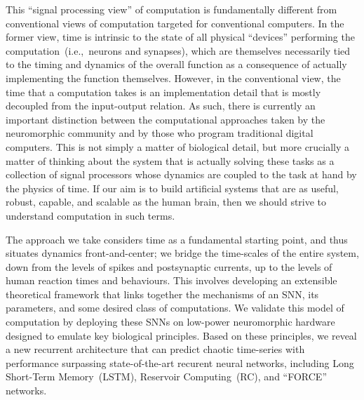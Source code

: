This ``signal processing view'' of computation is fundamentally different from conventional views of computation targeted for conventional computers.
In the former view, time is intrinsic to the state of all physical ``devices'' performing the computation~(i.e.,~neurons and synapses), which are themselves necessarily tied to the timing and dynamics of the overall function as a consequence of actually implementing the function themselves.
However, in the conventional view, the time that a computation takes is an implementation detail that is mostly decoupled from the input-output relation.
As such, there is currently an important distinction between the computational approaches taken by the neuromorphic community and by those who program traditional digital computers.
This is not simply a matter of biological detail, but more crucially a matter of thinking about the system that is actually solving these tasks as a collection of signal processors whose dynamics are coupled to the task at hand by the physics of time.
If our aim is to build artificial systems that are as useful, robust, capable, and scalable as the human brain, then we should strive to understand computation in such terms.

The approach we take considers time as a fundamental starting point, and thus situates dynamics front-and-center; we bridge the time-scales of the entire system, down from the levels of spikes and postsynaptic currents, up to the levels of human reaction times and behaviours. 
This involves developing an extensible theoretical framework that links together the mechanisms of an SNN, its parameters, and some desired class of computations.
We validate this model of computation by deploying these SNNs on low-power neuromorphic hardware designed to emulate key biological principles.
Based on these principles, we reveal a new recurrent architecture that can predict chaotic time-series with performance surpassing state-of-the-art recurent neural networks, including Long Short-Term Memory~(LSTM), Reservoir Computing~(RC), and ``FORCE'' networks.

